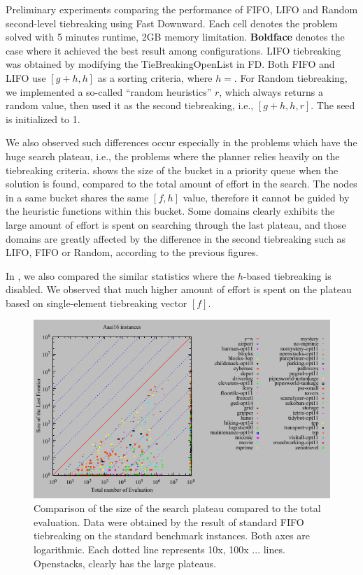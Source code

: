 \begin{table}[htbp]
 \centering
 
 \caption{Preliminary experiments comparing the performance of FIFO, LIFO and Random second-level tiebreaking using Fast Downward. Each cell denotes the problem solved with 5 minutes runtime, 2GB memory limitation. \textbf{Boldface} denotes the case where it achieved the best result among configurations. LIFO tiebreaking was obtained by modifying the TieBreakingOpenList in FD. Both FIFO and LIFO use $[g+h,h]$ as a sorting criteria, where $h=$\lmcut. For Random tiebreaking, we implemented a so-called ``random heuristics'' $r$, which always returns a random value, then used it as the second tiebreaking, i.e., $[g+h,h,r]$. The seed is initialized to 1.}
 \label{single-coverage}
\end{table}

We also observed such differences occur especially in the problems which have the huge search plateau, i.e., the problems where the planner relies heavily on the tiebreaking criteria.   shows the size of the bucket in a priority queue when the solution is found, compared to the total amount of effort in the search. 
The nodes in a same bucket shares the same $[f,h]$ value, therefore it cannot be guided by the  heuristic functions within this bucket.
Some domains clearly exhibits the large amount of effort is spent on searching through the last plateau, and those domains are greatly affected by the difference in the second tiebreaking such as LIFO, FIFO or Random, according to the previous figures.

In , we also compared the similar statistics where the $h$-based tiebreaking is disabled. We observed that much higher amount of effort is spent on the plateau based on single-element tiebreaking vector $[f]$.

\begin{figure}[htbp]
 \centering
 \includegraphics{tables/aaai16-front-vs-evaluated.pdf}
 \caption{Comparison of the size of the search plateau compared to the total evaluation. Data were obtained by the result of standard FIFO tiebreaking on the standard benchmark instances. Both axes are logarithmic. Each dotted line represents 10x, 100x ... lines.  Openstacks,  clearly has the large plateaus.}
 \label{plateau-h}
\end{figure}


